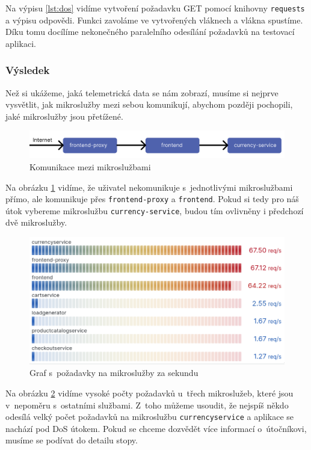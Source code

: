 Na výpisu \ref{lst:dos} vidíme vytvoření požadavku GET pomocí knihovny \texttt{requests} a výpisu odpovědi. Funkci zavoláme ve vytvořených vláknech a vlákna spustíme. Díku tomu docílíme nekonečného paralelního odesílání požadavků na testovací aplikaci.


\subsubsection{Výsledek}

Než si ukážeme, jaká telemetrická data se nám zobrazí, musíme si nejprve vysvětlit, jak mikroslužby mezi sebou komunikují, abychom později pochopili, jaké mikroslužby jsou přetížené. 

\begin{figure}[H]
  \centering
  \includegraphics[width=15cm]{obrazky-figures/comunication.png}
  \caption{Komunikace mezi mikroslužbami}
  \label{fig:comunication}
\end{figure}

Na obrázku \ref{fig:comunication} vidíme, že uživatel nekomunikuje s~jednotlivými mikroslužbami přímo, ale komunikuje přes \texttt{frontend-proxy} a \texttt{frontend}. Pokud si tedy pro náš útok vybereme mikroslužbu \texttt{currency-service}, budou tím ovlivněny i předchozí dvě mikroslužby.

\begin{figure}[H]
  \centering
  \includegraphics[width=13cm]{obrazky-figures/dos.png}
  \caption{Graf s~požadavky na mikroslužby za sekundu}
  \label{fig:dos}
\end{figure}

Na obrázku \ref{fig:dos} vidíme vysoké počty požadavků u~třech mikroslužeb, které jsou v~nepoměru s~ostatními službami. Z~toho můžeme usoudit, že nejspíš někdo odesílá velký počet požadavků na mikroslužbu \texttt{currencyservice} a aplikace se nachází pod DoS útokem. Pokud se chceme dozvědět více informací o~útočníkovi, musíme se podívat do detailu stopy.

